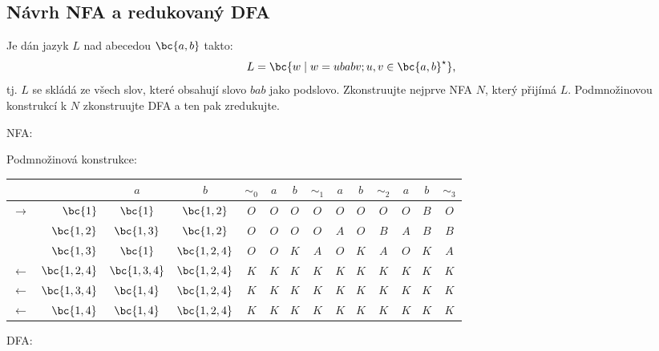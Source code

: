 \subsection{Návrh NFA a redukovaný DFA}
Je dán jazyk $L$ nad abecedou $\bc{a,b}$ takto:
\[L = \bc{w \mid w = ubabv; u,v\in\bc{a,b}^\star}\text{,}\]
tj. $L$ se skládá ze všech slov, které obsahují slovo $bab$ jako podslovo. Zkonstruujte nejprve NFA $N$, který přijímá
$L$. Podmnožinovou konstrukcí k $N$ zkonstruujte DFA a ten pak zredukujte.

NFA:


Podmnožinová konstrukce:

\begin{tabular}{|r r|c c||c|c c||c|c c||c|c c||c|}
    \hline
    & & $a$ & $b$ & $ \sim_0 $ & $a$ & $b$ & $\sim_1$ & $a$ & $b$ & $\sim_2$ & $a$ & $b$ & $\sim_3$ \\ \hline \hline
    $\to$  & $\bc{1}$    & $\bc{1}$    & $\bc{1,2}$   & $O$ & $O$ & $O$ & $O$ & $O$ & $O$ & $O$ & $O$ & $B$ & $O$ \\
           & $\bc{1,2}$  & $\bc{1,3}$  & $\bc{1,2}$   & $O$ & $O$ & $O$ & $O$ & $A$ & $O$ & $B$ & $A$ & $B$ & $B$ \\
           & $\bc{1,3}$  & $\bc{1}$    & $\bc{1,2,4}$ & $O$ & $O$ & $K$ & $A$ & $O$ & $K$ & $A$ & $O$ & $K$ & $A$ \\
    $\gets$& $\bc{1,2,4}$& $\bc{1,3,4}$& $\bc{1,2,4}$ & $K$ & $K$ & $K$ & $K$ & $K$ & $K$ & $K$ & $K$ & $K$ & $K$ \\
    $\gets$& $\bc{1,3,4}$& $\bc{1,4}$  & $\bc{1,2,4}$ & $K$ & $K$ & $K$ & $K$ & $K$ & $K$ & $K$ & $K$ & $K$ & $K$ \\
    $\gets$& $\bc{1,4}$  & $\bc{1,4}$  & $\bc{1,2,4}$ & $K$ & $K$ & $K$ & $K$ & $K$ & $K$ & $K$ & $K$ & $K$ & $K$ \\
    \hline
\end{tabular}

DFA:


